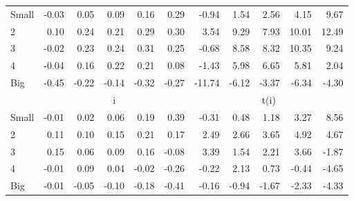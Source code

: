 \begin{table}[!ht]
\begin{tabular}{lrrrrrrrrrr}
    \\
      \cmidrule(r){2-6} \cmidrule(r){7-11}

    Small   & -0.03  & 0.05  & 0.09  & 0.16  & 0.29  & -0.94  & 1.54  & 2.56  & 4.15  & 9.67  \\
         2  & 0.10  & 0.24  & 0.21  & 0.29  & 0.30  & 3.54  & 9.29  & 7.93  & 10.01  & 12.49  \\
         3  & -0.02  & 0.23  & 0.24  & 0.31  & 0.25  & -0.68  & 8.58  & 8.32  & 10.35  & 9.24  \\
         4  & -0.04  & 0.16  & 0.22  & 0.21  & 0.08  & -1.43  & 5.98  & 6.65  & 5.81  & 2.04  \\
    Big     & -0.45  & -0.22  & -0.14  & -0.32  & -0.27  & -11.74  & -6.12  & -3.37  & -6.34  & -4.30  \\

  
    
      & \multicolumn{5}{c}{i} & \multicolumn{5}{c}{t(i)}
    
    \\
      \cmidrule(r){2-6} \cmidrule(r){7-11}

    Small   & -0.01  & 0.02  & 0.06  & 0.19  & 0.39  & -0.31  & 0.48  & 1.18  & 3.27  & 8.56  \\
         2  & 0.11  & 0.10  & 0.15  & 0.21  & 0.17  & 2.49  & 2.66  & 3.65  & 4.92  & 4.67  \\
         3  & 0.15  & 0.06  & 0.09  & 0.16  & -0.08  & 3.39  & 1.54  & 2.21  & 3.66  & -1.87  \\
         4  & -0.01  & 0.09  & 0.04  & -0.02  & -0.26  & -0.22  & 2.13  & 0.73  & -0.44  & -4.65  \\
    Big     & -0.01  & -0.05  & -0.10  & -0.18  & -0.41  & -0.16  & -0.94  & -1.67  & -2.33  & -4.33  \\

  

  \bottomrule
\end{tabular}
\label{tbl:25_Size_Beta_FF2015}
\end{table}